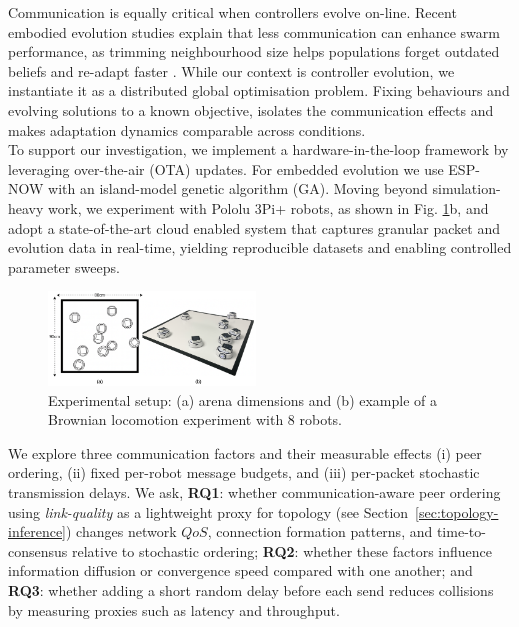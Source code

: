\documentclass[conference]{IEEEtran}
\begin{document}
Communication is equally critical when controllers evolve on-line. Recent embodied evolution studies explain that less communication can enhance swarm performance, as trimming neighbourhood size helps populations forget outdated beliefs and re-adapt faster \cite{hiraga_when_2023}\cite{ding_advancements_2023}. While our context is controller evolution, we instantiate it as a distributed global optimisation problem. Fixing behaviours and evolving solutions to a known objective, isolates the communication effects and makes adaptation dynamics comparable across conditions. \\

To support our investigation, we implement a hardware-in-the-loop framework by leveraging over-the-air (OTA) updates. For embedded evolution we use ESP-NOW with an island-model genetic algorithm (GA). Moving beyond simulation-heavy work, we experiment with Pololu 3Pi+ robots, as shown in Fig. \ref{fig:arena}b, and adopt a state-of-the-art cloud enabled system that captures granular packet and evolution data in real-time, yielding reproducible datasets and enabling controlled parameter sweeps.

\begin{figure}[H]
    \centering
    \includegraphics[width=0.49\textwidth]{arena.png}
    \caption{Experimental setup: (a) arena dimensions and (b) example of a Brownian locomotion experiment with 8 robots.}
    \label{fig:arena}
\end{figure}

We explore three communication factors and their measurable effects (i) peer ordering, (ii) fixed per-robot message budgets, and (iii) per-packet stochastic transmission delays. We ask, \textbf{RQ1}: whether communication-aware peer ordering using \emph{link-quality} as a lightweight proxy for topology (see Section~\ref{sec:topology-inference}) changes network $QoS$, connection formation patterns, and time-to-consensus relative to stochastic ordering; \textbf{RQ2}: whether these factors influence information diffusion or convergence speed compared with one another; and \textbf{RQ3}: whether adding a short random delay before each send reduces collisions by measuring proxies such as latency and throughput.
\end{document}
